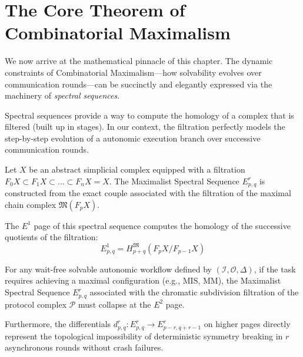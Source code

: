 \section{The Core Theorem of Combinatorial Maximalism}

We now arrive at the mathematical pinnacle of this chapter. The dynamic constraints of Combinatorial Maximalism---how solvability evolves over communication rounds---can be succinctly and elegantly expressed via the machinery of \textit{spectral sequences}.

Spectral sequences provide a way to compute the homology of a complex that is filtered (built up in stages). In our context, the filtration perfectly models the step-by-step evolution of a autonomic execution branch over successive communication rounds.

\begin{definition}
Let $X$ be an abstract simplicial complex equipped with a filtration $F_0 X \subset F_1 X \subset \dots \subset F_n X = X$. The Maximalist Spectral Sequence $E_{p,q}^r$ is constructed from the exact couple associated with the filtration of the maximal chain complex $\mathfrak{M}(F_p X)$. 

The $E^1$ page of this spectral sequence computes the homology of the successive quotients of the filtration:
\[
E_{p,q}^1 = H_{p+q}^{\mathfrak{M}}(F_p X / F_{p-1} X)
\]
\end{definition}

\begin{theorem}
\label{thm:core_maximalism}
For any wait-free solvable autonomic workflow defined by $(\mathcal{I}, \mathcal{O}, \Delta)$, if the task requires achieving a maximal configuration (e.g., MIS, MM), the Maximalist Spectral Sequence $E_{p,q}^r$ associated with the chromatic subdivision filtration of the protocol complex $\mathcal{P}$ must collapse at the $E^2$ page.

Furthermore, the differentials $d^r_{p,q}: E^r_{p,q} \to E^r_{p-r, q+r-1}$ on higher pages directly represent the topological impossibility of deterministic symmetry breaking in $r$ asynchronous rounds without crash failures.
\end{theorem}

